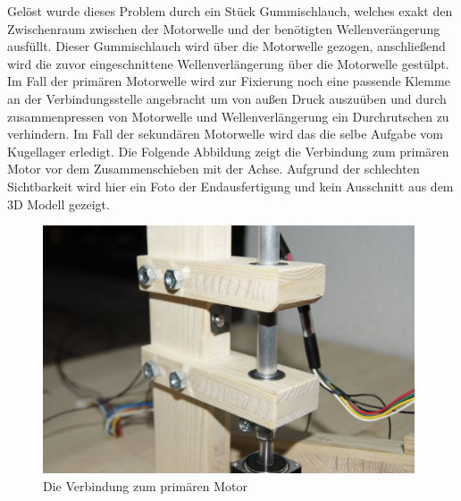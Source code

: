 \begin{itemize}
Gelöst wurde dieses Problem durch ein Stück Gummischlauch, welches exakt den Zwischenraum zwischen der Motorwelle und der benötigten Wellenverängerung ausfüllt. Dieser Gummischlauch wird über die Motorwelle gezogen, anschließend wird die zuvor eingeschnittene Wellenverlängerung über die Motorwelle gestülpt. Im Fall der primären Motorwelle wird zur Fixierung noch eine passende Klemme an der Verbindungsstelle angebracht um von außen Druck auszuüben und durch zusammenpressen von Motorwelle und Wellenverlängerung ein Durchrutschen zu verhindern. Im Fall der sekundären Motorwelle wird das die selbe Aufgabe vom Kugellager erledigt. Die Folgende Abbildung zeigt die Verbindung zum primären Motor vor dem Zusammenschieben mit der Achse. Aufgrund der schlechten Sichtbarkeit wird hier ein Foto der Endausfertigung und kein Ausschnitt aus dem 3D Modell gezeigt.
\begin{figure}[H]
\centering
\includegraphics[width=11cm]{images/motor}
\caption{Die Verbindung zum primären Motor}
\end{figure}
\end{itemize}